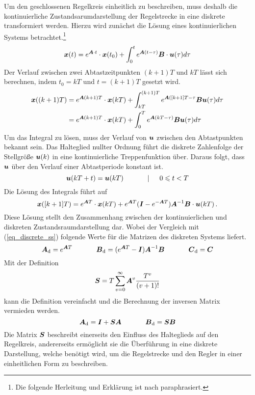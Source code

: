 Um den geschlossenen Regelkreis einheitlich zu beschreiben, muss deshalb die kontinuierliche Zustandsarumdarstellung der Regelstrecke in eine diskrete transformiert werden. Hierzu wird zunächst die Lösung eines kontinuierlichen Systems  betrachtet.\footnote{Die folgende Herleitung und Erklärung ist nach \cite[S. 170 f.]{UnbehauenRT2} paraphrasiert.}
\begin{equation}
\boldsymbol{x}(t) = e^{\boldsymbol{A}\cdot t}\cdot \boldsymbol{x}(t_0) + \int^t_0 e^{\boldsymbol{A}(t-\tau)}\boldsymbol{B}\cdot \boldsymbol{u}(\tau)d\tau
\end{equation}
Der Verlauf zwischen zwei Abtastzeitpunkten $(k+1)T$ und $kT$ lässt sich  berechnen, indem $t_0=kT$ und $t=(k+1)T$ gesetzt wird.
\begin{equation}
\begin{split}
\boldsymbol{x}( (k+1)T) &= e^{\boldsymbol{A}(k+1)T}\cdot \boldsymbol{x}(kT) + \int^{(k+1)T}_{kT} e^{\boldsymbol{A}([k+1]T-\tau}\boldsymbol{B}\boldsymbol{u}(\tau)d\tau \\
&= e^{\boldsymbol{A}(k+1)T}\cdot \boldsymbol{x}(kT) + \int^T_0 e^{\boldsymbol{A}(kT-\tau)}\boldsymbol{B}\boldsymbol{u}(\tau)d\tau
\end{split}
\end{equation}
Um das Integral zu lösen, muss der Verlauf von $\boldsymbol{u}$ zwischen den Abtastpunkten bekannt sein. Das Halteglied nullter Ordnung führt die diskrete Zahlenfolge der Stellgröße $\boldsymbol{u}(k)$ in eine kontinuierliche Treppenfunktion über. Daraus folgt, dass $\boldsymbol{u}$ über den Verlauf einer Abtastperiode konstant ist.
\begin{equation}
\boldsymbol{u}(kT+t) = \boldsymbol{u}(kT) \hspace{35pt} \vert \hspace{15pt} 0 \leqslant t < T
\end{equation}
Die Lösung des Integrals führt auf
\begin{equation}
\boldsymbol{x}([k+1]T) = e^{\boldsymbol{A}T}\cdot \boldsymbol{x}(kT) + e^{\boldsymbol{A}T}(\boldsymbol{I}-e^{-\boldsymbol{A}T})\boldsymbol{A}^{-1}\boldsymbol{B}\cdot \boldsymbol{u}(kT)\,.
\end{equation}
Diese Lösung stellt den Zusammenhang zwischen der kontinuierlichen und diskreten Zustandsraumdarstellung dar. Wobei der Vergleich mit (\ref{eq_discrete_ss}) folgende Werte für die Matrizen des diskreten Systems  liefert.
\begin{equation}
\boldsymbol{A}_{\text{d}} = e^{\boldsymbol{A}T} \hspace{35pt} \boldsymbol{B}_{\text{d}} = (e^{\boldsymbol{A}T}-\boldsymbol{I})\boldsymbol{A}^{-1}\boldsymbol{B} \hspace{35pt} \boldsymbol{C}_{\text{d}} = \boldsymbol{C}
\end{equation}
Mit der Definition
\begin{equation}
\boldsymbol{S} = T \sum^{\infty}_{v=0}\boldsymbol{A}^v\frac{T^v}{(v+1)!}
\end{equation}
kann die Definition vereinfacht und die Berechnung der inversen Matrix vermieden werden.
\begin{equation}
\boldsymbol{A}_{\text{d}} = \boldsymbol{I}+\boldsymbol{S}\boldsymbol{A}\hspace{35pt} \boldsymbol{B}_{\text{d}} = \boldsymbol{SB}
\end{equation}
Die Matrix $\boldsymbol{S}$ beschreibt einerseits den Einfluss des Halteglieds auf den Regelkreis, andererseits ermöglicht sie die Überführung in eine diskrete Darstellung, welche benötigt wird, um die Regelstrecke und den Regler in einer einheitlichen Form zu beschreiben. 